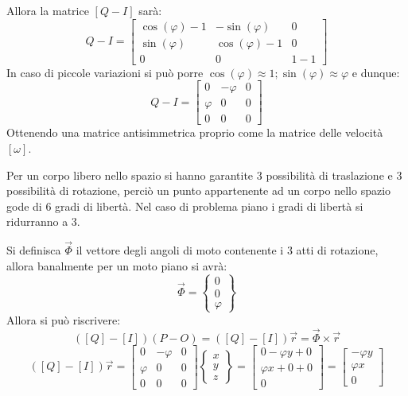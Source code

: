 \documentclass{article}
\begin{document}
\begin{adjustwidth}{2in}{}
Allora la matrice $[Q-I]$ sarà:
\[
Q -I = \left[\begin{array}{ccc}
	\cos(\varphi)-1 & -\sin(\varphi) & 0 \\
	\sin(\varphi) & \cos(\varphi)-1 & 0 \\
	0 & 0 & 1-1
\end{array}
\right]
\]
In caso di piccole variazioni si può porre $\cos(\varphi) \approx 1; \sin(\varphi) \approx \varphi$ e dunque:
\[
Q -I = \left[\begin{array}{ccc}
	0 & -\varphi & 0 \\
	\varphi & 0 & 0 \\
	0 & 0 & 0
\end{array}
\right]
\]
Ottenendo una matrice antisimmetrica proprio come la matrice delle velocità $[\omega]$.\newline

Per un corpo libero nello spazio si hanno garantite 3 possibilità di traslazione e 3 possibilità di rotazione, perciò un punto appartenente ad un corpo nello spazio gode di 6 gradi di libertà. Nel caso di problema piano i gradi di libertà si ridurranno a 3. \newline

Si definisca $\vec{\Phi}$ il vettore degli angoli di moto contenente i 3 atti di rotazione, allora banalmente per un moto piano si avrà:
\[\vec{\Phi} = \left\lbrace \begin{array}{c}
	0 \\
	0 \\
	\varphi
\end{array} \right\rbrace \]
Allora si può riscrivere: 
\[([Q] - [I])(P-O) = ([Q] - [I])\vec{r} = \vec{\Phi} \times \vec{r} \]
\[ ([Q] - [I])\vec{r} = \left[\begin{array}{ccc}
	0 & -\varphi & 0 \\
	\varphi & 0 & 0 \\
	0 & 0 & 0
\end{array}
\right] \left\lbrace \begin{array}{c}
	x \\
	y \\
	z
\end{array} \right\rbrace = \left[ \begin{array}{c}
0 -\varphi y + 0 \\
\varphi x +0 +0  \\
0
\end{array} \right] = \left[ \begin{array}{c}
-\varphi y \\
\varphi x   \\
0
\end{array} \right] \]


\end{adjustwidth}
\end{document}
